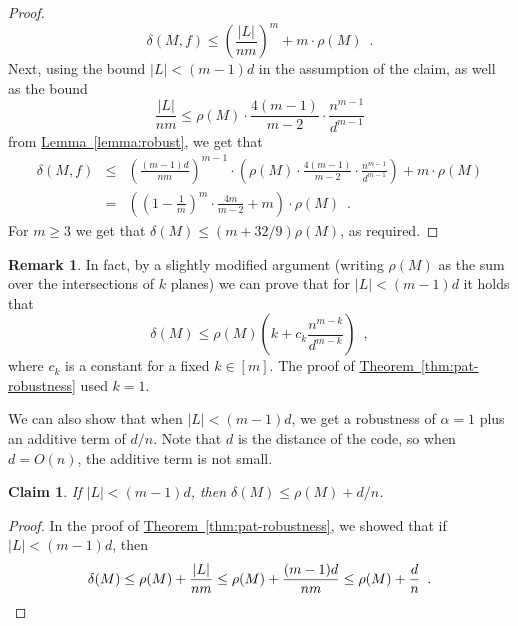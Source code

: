 \documentclass[11pt]{article}
\numberwithin{equation}{section}
\newtheorem{claim}[theorem]{Claim}
\theoremstyle{definition}
\newtheorem{remark}[theorem]{Remark}
\theoremstyle{plain}
\newcommand{\expref}[2]{\hyperref[#2]{#1~\ref{#2}}}
\theoremstyle{plain}
\newcommand{\colored}{}
\newcommand{\reldist}{\colored{\delta}}
\newcommand{\robust}{\colored{\rho}} %
\newcommand{\codedist}{\colored{d}} %
\newcommand{\blocklength}{\colored{n}} %
\newcommand{\testerinput}{\colored{M}} %
\newcommand{\closestglobalword}{\colored{f}} %
\newcommand\abs[1]{\colored{\left|#1\right|}}
\begin{document}
\begin{proof}
\begin{equation*}
  \reldist(\testerinput,\closestglobalword)
  \leq  \left(\frac{\abs{L}}{\blocklength m}\right)^m + m \cdot \robust(\testerinput)\enspace.
\end{equation*}
Next, using the bound $\abs{L} < (m-1)\codedist$ in the assumption of the claim,
as well as the bound
\[
  \frac{\abs{L}}{\blocklength m} \leq \robust(\testerinput) \cdot \frac{4(m-1)}{m-2} \cdot \frac{\blocklength^{m-1}}{\codedist^{m-1}}
\]
from \expref{Lemma}{lemma:robust}, we get that
\begin{eqnarray*}
  \reldist(\testerinput,\closestglobalword)
  & \leq & \left(\frac{(m-1)\codedist}{\blocklength m}\right)^{m-1} \cdot
  \left( \robust(\testerinput) \cdot \frac{4(m-1)}{m-2} \cdot \frac{\blocklength^{m-1}}{\codedist^{m-1}} \right) + m \cdot \robust(\testerinput) \\
  & = & \left( \left(1  - \frac{1}{m}\right)^{m} \cdot \frac{4m}{m-2} + m \right) \cdot \robust(\testerinput) \enspace.
\end{eqnarray*}
For $m \geq 3$ we get that $\reldist(\testerinput) \leq (m + 32/9) \robust(\testerinput)$, as required.
\end{proof}

\begin{remark}
In fact, by a slightly modified argument (writing $\robust(\testerinput)$ as the sum over the intersections of $k$ planes) we can prove that for $\abs{L} < (m-1)\codedist$
it holds that
\[
  \reldist(\testerinput) \leq \robust(\testerinput) \left( k + c_k \frac{\blocklength^{m-k}}{\codedist^{m-k}}\right)\enspace,
\]
where $c_k$ is a constant for a fixed $k \in [m]$. The proof of \expref{Theorem}{thm:pat-robustness} used $k = 1$.
\end{remark}

We can also show that when $\abs{L} < (m-1) \codedist$, we get a robustness of $\alpha = 1$ plus an additive term of $\codedist/\blocklength$. Note that $\codedist$ is the distance of the code, so when $\codedist = O(\blocklength)$, the additive term is not small.

\begin{claim}
If $\abs{L} < (m-1) \codedist$, then $\reldist(\testerinput) \leq \robust(\testerinput ) + \codedist/\blocklength$.
\end{claim}
\begin{proof}
In the proof of \expref{Theorem}{thm:pat-robustness}, we showed that if $\abs{L} < (m-1)\codedist$, then
\begin{equation*}
\reldist(\testerinput) \leq \robust(\testerinput) + \frac{\abs{L}}{\blocklength m} \leq  \robust(\testerinput) + \frac{(m-1)\codedist}{\blocklength m} \leq \robust(\testerinput) + \frac{\codedist}{\blocklength} \enspace. \qedhere
\end{equation*}
\end{proof}
\end{document}
